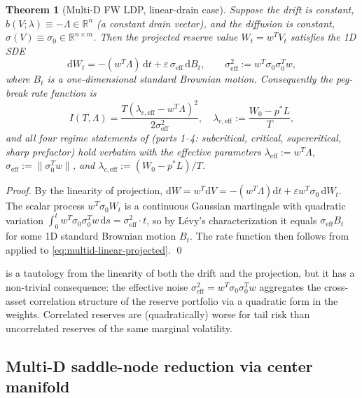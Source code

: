 \documentclass[11pt,a4paper]{article}
\theoremstyle{plain}
\newtheorem{theorem}{Theorem}[section]
\theoremstyle{definition}
\newcommand{\R}{\mathbb{R}}
\newcommand{\eps}{\varepsilon}
\renewcommand{\d}{\mathrm{d}}
\begin{document}
\begin{theorem}[Multi-D FW LDP, linear-drain case]
\label{thm:multid-linear}
Suppose the drift is constant, $b(V;\lambda) \equiv -\Lambda \in \R^n$ (a constant drain vector), and the diffusion is constant, $\sigma(V) \equiv \sigma_0 \in \R^{n\times m}$. Then the projected reserve value $W_t = w^T V_t$ satisfies the 1D SDE
\begin{equation}
    \d W_t = -(w^T\Lambda)\,\d t + \eps\,\sigma_{\text{eff}}\,\d B_t, \qquad \sigma_{\text{eff}}^2 := w^T\sigma_0\sigma_0^T w,
    \label{eq:multid-linear-projected}
\end{equation}
where $B_t$ is a one-dimensional standard Brownian motion. Consequently the peg-break rate function is
\begin{equation}
    I(T,\Lambda) = \frac{T(\lambda_{c,\text{eff}} - w^T\Lambda)^2}{2\sigma_{\text{eff}}^2},\quad \lambda_{c,\text{eff}} := \frac{W_0 - p^*L}{T},
    \label{eq:multid-linear-rate}
\end{equation}
and all four regime statements of  (parts 1--4: subcritical, critical, supercritical, sharp prefactor) hold verbatim with the effective parameters $\lambda_{\text{eff}} := w^T\Lambda$, $\sigma_{\text{eff}} := \|\sigma_0^T w\|$, and $\lambda_{c,\text{eff}} := (W_0 - p^*L)/T$.
\end{theorem}

\begin{proof}
By the linearity of projection, $\d W = w^T \d V = -(w^T\Lambda)\d t + \eps w^T\sigma_0\,\d W_t$. The scalar process $w^T\sigma_0 W_t$ is a continuous Gaussian martingale with quadratic variation $\int_0^t w^T\sigma_0\sigma_0^T w\,\d s = \sigma_{\text{eff}}^2 \cdot t$, so by L\'evy's characterization \cite[Thm~3.3.16]{KaratzasShreve1991} it equals $\sigma_{\text{eff}} B_t$ for some 1D standard Brownian motion $B_t$. The rate function then follows from  applied to \eqref{eq:multid-linear-projected}.
\qed
\end{proof}

 is a tautology from the linearity of both the drift and the projection, but it has a non-trivial consequence: the effective noise $\sigma_{\text{eff}}^2 = w^T \sigma_0\sigma_0^T w$ aggregates the cross-asset correlation structure of the reserve portfolio via a quadratic form in the weights. Correlated reserves are (quadratically) worse for tail risk than uncorrelated reserves of the same marginal volatility.

\subsection{Multi-D saddle-node reduction via center manifold}
\end{document}
